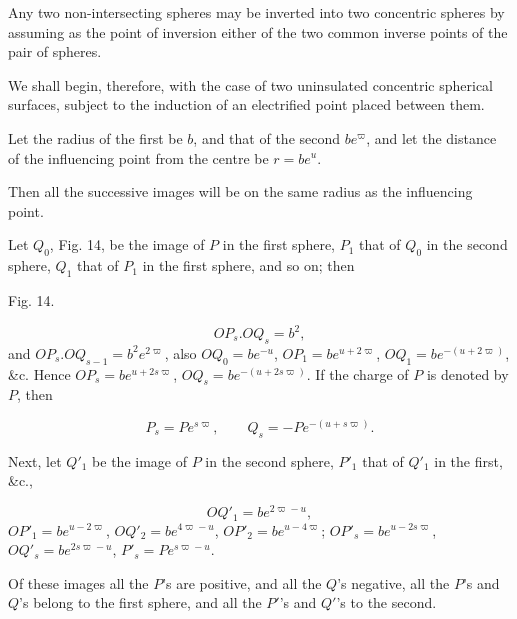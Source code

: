 \documentclass[11pt,a4paper]{article}
\begin{document}
Any two non-intersecting spheres may be inverted into two concentric
spheres by assuming as the point of inversion either of the two common
inverse points of the pair of spheres.

We shall begin, therefore, with the case of two uninsulated concentric
spherical surfaces, subject to the induction of an electrified point
placed between them.

Let the radius of the first be $b$, and that of the second $be^\varpi$,
and let the distance of the influencing point from the centre be
$r=be^u$.

Then all the successive images will be on the same radius as the influencing point.

Let $Q_0$, Fig. 14, be the image of $P$ in the first sphere, $P_1$
that of $Q_0$ in the second sphere, $Q_1$ that of $P_1$ in the first
sphere, and so on; then

\begin{center}

Fig. 14.
\end{center}

\[
OP_s.OQ_s=b^2,
\]
and $OP_s.OQ_{s-1}=b^2e^{2\varpi}$, also
$OQ_0=be^{-u}$, $OP_1=be^{u+2\varpi}$,
$OQ_1=be^{-(u+2\varpi)}$, \&c. Hence
$OP_s=be^{u+2s\varpi}$, $OQ_s=be^{-(u+2s\varpi)}$.
If the charge of $P$ is denoted by $P$, then

\[
P_s=Pe^{s\varpi},\qquad Q_s=-Pe^{-(u+s\varpi)}.
\]

Next, let $Q'_1$ be the image of $P$ in the second sphere, $P'_1$ that
of $Q'_1$ in the first, \&c.,

\[
OQ'_1=be^{2\varpi-u},
\]
$OP'_1=be^{u-2\varpi}$, $OQ'_2=be^{4\varpi-u}$,
$OP'_2=be^{u-4\varpi}$; $OP'_s=be^{u-2s\varpi}$,
$OQ'_s=be^{2s\varpi-u}$, $P'_s=Pe^{s\varpi-u}$.

Of these images all the $P$'s are positive, and all the $Q$'s
negative, all the $P$'s and $Q$'s belong to the first sphere, and all
the $P'$'s and $Q'$'s to the second.
\end{document}
